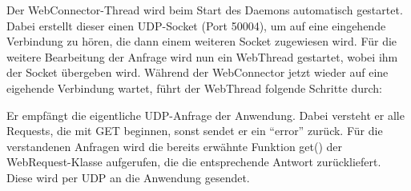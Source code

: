 \documentclass[a4paper,14pt,headsepline]{scrartcl}
\begin{document}
\begin{figure}[h]
\begin{center}
\end{center}
\end{figure}

\newpage
Der WebConnector-Thread wird beim Start des Daemons automatisch gestartet. Dabei erstellt dieser einen UDP-Socket (Port 50004), um auf eine eingehende Verbindung zu hören, die dann einem weiteren Socket zugewiesen wird. Für die weitere Bearbeitung der Anfrage wird nun ein WebThread gestartet, wobei ihm der Socket übergeben wird. Während der WebConnector jetzt wieder auf eine eigehende Verbindung wartet, führt der WebThread folgende Schritte durch:

Er empfängt die eigentliche UDP-Anfrage der Anwendung. Dabei versteht er alle Requests, die mit GET beginnen, sonst sendet er ein ``error'' zurück. Für die verstandenen Anfragen wird die bereits erwähnte Funktion get() der WebRequest-Klasse aufgerufen, die die entsprechende Antwort zurückliefert. Diese wird per UDP an die Anwendung gesendet. 
\end{document}
